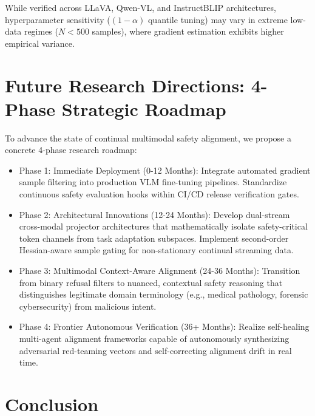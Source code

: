 \documentclass[10pt,twocolumn,letterpaper]{article}
\begin{document}
\begin{table}[t]
\begin{table}[t]
While verified across LLaVA, Qwen-VL, and InstructBLIP architectures, hyperparameter sensitivity ($(1-\alpha)$ quantile tuning) may vary in extreme low-data regimes ($N < 500$ samples), where gradient estimation exhibits higher empirical variance.




\section{Future Research Directions: 4-Phase Strategic Roadmap}


To advance the state of continual multimodal safety alignment, we propose a concrete 4-phase research roadmap:
\begin{itemize}
  \item Phase 1: Immediate Deployment (0-12 Months): Integrate automated gradient sample filtering into production VLM fine-tuning pipelines. Standardize continuous safety evaluation hooks within CI/CD release verification gates.
  \item Phase 2: Architectural Innovations (12-24 Months): Develop dual-stream cross-modal projector architectures that mathematically isolate safety-critical token channels from task adaptation subspaces. Implement second-order Hessian-aware sample gating for non-stationary continual streaming data.
  \item Phase 3: Multimodal Context-Aware Alignment (24-36 Months): Transition from binary refusal filters to nuanced, contextual safety reasoning that distinguishes legitimate domain terminology (e.g., medical pathology, forensic cybersecurity) from malicious intent.
  \item Phase 4: Frontier Autonomous Verification (36+ Months): Realize self-healing multi-agent alignment frameworks capable of autonomously synthesizing adversarial red-teaming vectors and self-correcting alignment drift in real time.
\end{itemize}




\section{Conclusion}



\end{table}
\end{table}
\end{document}
